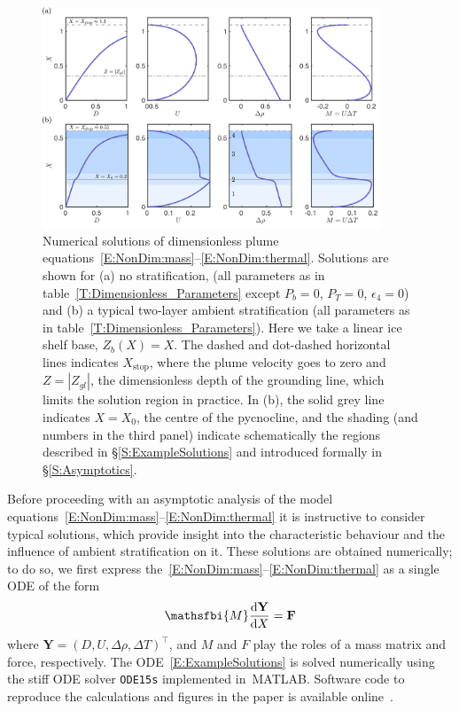 \documentclass{jfm}
\newcommand{\dd}[2]{\frac{\mathrm{d} #1}{\mathrm{d} #2}}
\newcommand{\epsfour}{\epsilon_{4}}
\newcommand{\Pt}{\textit{P}_T}
\begin{document}
\begin{figure}
\centering
\includegraphics[width = 0.9\textwidth]{fig3_example_solutions}
\caption{Numerical solutions of dimensionless plume equations~\eqref{E:NonDim:mass}--\eqref{E:NonDim:thermal}. Solutions are shown for (a) no stratification, (all parameters as in table~\ref{T:Dimensionless_Parameters} except $P_b = 0$, $\Pt = 0$, $\epsfour = 0$) and (b)  a typical two-layer ambient stratification (all parameters as in table~\ref{T:Dimensionless_Parameters}). Here we take a linear ice shelf base, $Z_b(X) = X$. The dashed and dot-dashed horizontal lines indicates $X_{\text{stop}}$, where the plume velocity goes to zero and $Z = |Z_{gl}|$, the dimensionless depth of the grounding line, which limits the solution region in practice. In (b), the solid grey line indicates $X = X_0$, the centre of the pycnocline, and the shading (and numbers in the third panel) indicate schematically the regions described in \S\ref{S:ExampleSolutions} and introduced formally in \S\ref{S:Asymptotics}. }\label{fig:ExampleSols}
\end{figure}

Before proceeding with an asymptotic analysis of the model equations~\eqref{E:NonDim:mass}--\eqref{E:NonDim:thermal} it is instructive to consider typical solutions, which provide insight into the characteristic behaviour and the influence of ambient stratification on it. These solutions are obtained numerically; to do so, we first express the~\eqref{E:NonDim:mass}--\eqref{E:NonDim:thermal} as a single ODE of the form
\begin{equation}\label{E:ExampleSolutions}
\mathsfbi{M} \dd{\mathbf{Y}}{X} = \mathbf{F}
\end{equation}
where $\mathbf{Y} = (D, U, \Delta \rho, \Delta T)^\intercal$, and $M$ and $F$ play the roles of a mass matrix and force, respectively. The ODE~\eqref{E:ExampleSolutions} is solved numerically using the stiff 
ODE solver \texttt{ODE15s} implemented in~\textsc{MATLAB}.  Software code to reproduce the calculations and figures in the paper is available online~\citep{PycnoclineCode}.
\end{document}
